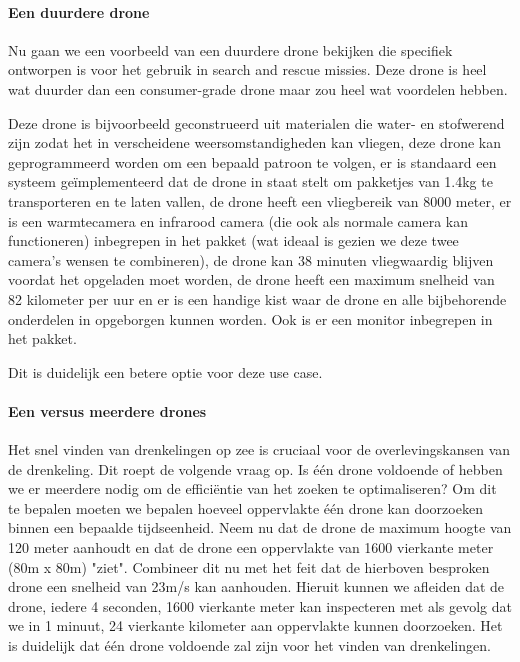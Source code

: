 \paragraph{Een duurdere drone}

Nu gaan we een voorbeeld van een duurdere drone bekijken die specifiek ontworpen is voor het gebruik in search and rescue missies. Deze drone is heel wat duurder dan een consumer-grade drone maar zou heel wat voordelen hebben. \autocite{Industrial}

Deze drone is bijvoorbeeld geconstrueerd uit materialen die water- en stofwerend zijn zodat het in verscheidene weersomstandigheden kan vliegen, deze drone kan geprogrammeerd worden om een bepaald patroon te volgen, er is standaard een systeem geïmplementeerd dat de drone in staat stelt om pakketjes van 1.4kg te transporteren en te laten vallen, de drone heeft een vliegbereik van 8000 meter, er is een warmtecamera en infrarood camera (die ook als normale camera kan functioneren) inbegrepen in het pakket (wat ideaal is gezien we deze twee camera's wensen te combineren), de drone kan 38 minuten vliegwaardig blijven voordat het opgeladen moet worden, de drone heeft een maximum snelheid van 82 kilometer per uur en er is een handige kist waar de drone en alle bijbehorende onderdelen in opgeborgen kunnen worden. Ook is er een monitor inbegrepen in het pakket.

Dit is duidelijk een betere optie voor deze use case.

\paragraph{Een versus meerdere drones}

Het snel vinden van drenkelingen op zee is cruciaal voor de overlevingskansen van de drenkeling. Dit roept de volgende vraag op. Is één drone voldoende of hebben we er meerdere nodig om de efficiëntie van het zoeken te optimaliseren? Om dit te bepalen moeten we bepalen hoeveel oppervlakte één drone kan doorzoeken binnen een bepaalde tijdseenheid. Neem nu dat de drone de maximum hoogte van 120 meter aanhoudt en dat de drone een oppervlakte van 1600 vierkante meter (80m x 80m) "ziet". Combineer dit nu met het feit dat de hierboven besproken drone een snelheid van 23m/s kan aanhouden. Hieruit kunnen we afleiden dat de drone, iedere 4 seconden, 1600 vierkante meter kan inspecteren met als gevolg dat we in 1 minuut, 24 vierkante kilometer aan oppervlakte kunnen doorzoeken. Het is duidelijk dat één drone voldoende zal zijn voor het vinden van drenkelingen. 


